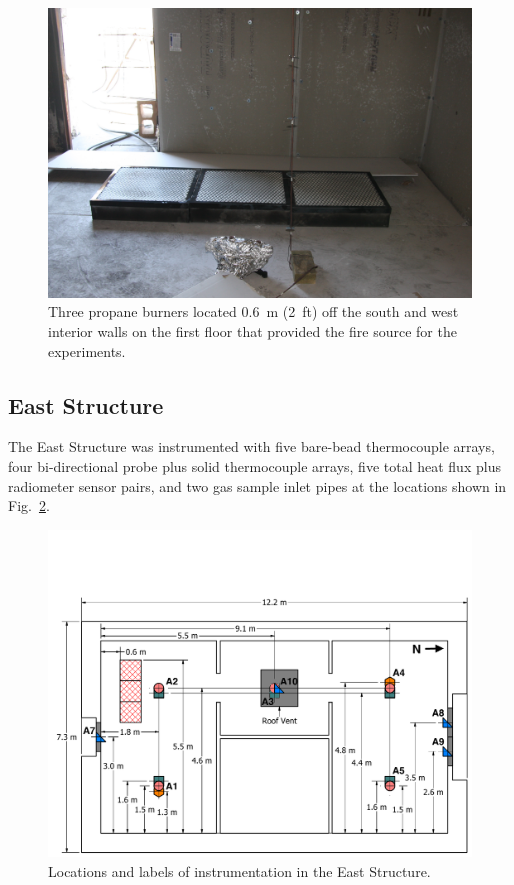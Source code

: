 \documentclass[12pt,oneside]{book}
\begin{document}
\begin{figure}[!ht]
	\includegraphics[width=0.9\columnwidth]{../Figures/Pictures/burners}
	\caption[Three propane burners used as the fuel source.]{Three propane burners located 0.6~m (2~ft) off the south and west interior walls on the first floor that provided the fire source for the experiments.}
	\label{fig:burners}
\end{figure}

\FloatBarrier

\subsection{East Structure}
The East Structure was instrumented with five bare-bead thermocouple arrays, four bi-directional probe plus solid thermocouple arrays, five total heat flux plus radiometer sensor pairs, and two gas sample inlet pipes at the locations shown in Fig.~\ref{fig:east_instrumentation}.

\begin{figure}[!ht]
	\includegraphics[width=\columnwidth]{../Figures/Floor_Plans/East_Structure_Dimensioned_Instrumentation}
	\caption{Locations and labels of instrumentation in the East Structure.}
	\label{fig:east_instrumentation}
\end{figure}
\FloatBarrier
\end{document}
